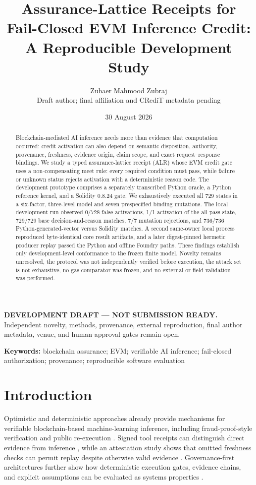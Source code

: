 \documentclass[10pt]{article}
\title{\textbf{Assurance-Lattice Receipts for Fail-Closed EVM Inference Credit:}\\A Reproducible Development Study}
\author{Zubaer Mahmood Zubraj\\\small Draft author; final affiliation and CRediT metadata pending}
\date{30 August 2026}
\newcommand{\statusbanner}{\noindent\colorbox{orange!18}{\parbox{0.965\linewidth}{\centering\small\textbf{DEVELOPMENT DRAFT --- NOT SUBMISSION READY.} Independent novelty, methods, provenance, external reproduction, final author metadata, venue, and human-approval gates remain open.}}}
\begin{document}
\maketitle
\statusbanner

\begin{abstract}
Blockchain-mediated AI inference needs more than evidence that computation occurred:
credit activation can also depend on semantic disposition, authority, provenance,
freshness, evidence origin, claim scope, and exact request--response bindings. We
study a typed assurance-lattice receipt (ALR) whose EVM credit gate uses a
non-compensating meet rule: every required condition must pass, while failure or
unknown status rejects activation with a deterministic reason code. The development
prototype comprises a separately transcribed Python oracle, a Python reference kernel, and a
Solidity 0.8.24 gate. We exhaustively executed all 729 states in a six-factor,
three-level model and seven prespecified binding mutations. The local development
run observed 0/728 false activations, 1/1 activation of the all-pass state, 729/729
base decision-and-reason matches, 7/7 mutation rejections, and 736/736
Python-generated-vector versus Solidity matches. A second same-owner local process
reproduced byte-identical core result artifacts, and a later digest-pinned hermetic
producer replay passed the Python and offline Foundry paths. These findings establish only
development-level conformance to the frozen finite model. Novelty remains unresolved,
the protocol was not independently verified before execution, the attack set is not
exhaustive, no gas comparator was frozen, and no external or field validation was
performed.
\end{abstract}

\noindent\textbf{Keywords:} blockchain assurance; EVM; verifiable AI inference;
fail-closed authorization; provenance; reproducible software evaluation

\section{Introduction}

Optimistic and deterministic approaches already provide mechanisms for verifiable
blockchain-based machine-learning inference, including fraud-proof-style verification
and public re-execution \cite{conway2024opml,alves2026eigenai}. Signed tool receipts
can distinguish direct evidence from inference \cite{basu2026toolreceipts}, while an
attestation study shows that omitted freshness checks can permit replay despite
otherwise valid evidence \cite{sokolov2026freshness}. Governance-first architectures
further show how deterministic execution gates, evidence chains, and explicit
assumptions can be evaluated as systems properties \cite{calboreanu2026lattice}.
\end{document}
